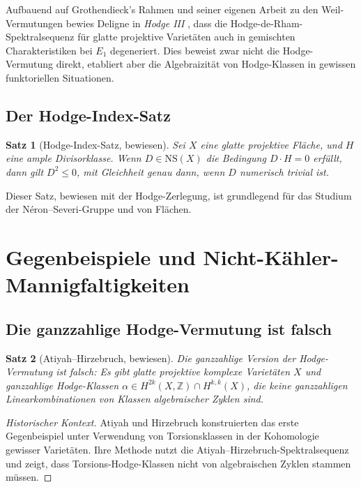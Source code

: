 \documentclass[12pt,a4paper]{amsart}
\newtheorem{theorem}{Satz}[section]
\theoremstyle{definition}
\theoremstyle{remark}
\begin{document}
Aufbauend auf Grothendieck's Rahmen und seiner eigenen Arbeit zu den Weil-Vermutungen
bewies Deligne in \emph{Hodge III} \cite{deligne1974}, dass die Hodge-de-Rham-Spektralsequenz
für glatte projektive Varietäten auch in gemischten Charakteristiken bei $E_1$ degeneriert.
Dies beweist zwar nicht die Hodge-Vermutung direkt, etabliert aber die Algebraizität von
Hodge-Klassen in gewissen funktoriellen Situationen.

\subsection{Der Hodge-Index-Satz}

\begin{theorem}[Hodge-Index-Satz, bewiesen]
\label{thm:hodge-index}
Sei $X$ eine glatte projektive Fläche, und $H$ eine ample Divisorklasse. Wenn
$D \in \mathrm{NS}(X)$ die Bedingung $D \cdot H = 0$ erfüllt, dann gilt $D^2 \le 0$,
mit Gleichheit genau dann, wenn $D$ numerisch trivial ist.
\end{theorem}

Dieser Satz, bewiesen mit der Hodge-Zerlegung, ist grundlegend für das Studium der
Néron–Severi-Gruppe und von Flächen.

\section{Gegenbeispiele und Nicht-Kähler-Mannigfaltigkeiten}
\label{sec:gegenbeispiele}

\subsection{Die ganzzahlige Hodge-Vermutung ist falsch}

\begin{theorem}[Atiyah–Hirzebruch, bewiesen]
\label{thm:ah-gegenbeispiel}
Die ganzzahlige Version der Hodge-Vermutung ist falsch: Es gibt glatte projektive
komplexe Varietäten $X$ und ganzzahlige Hodge-Klassen
$\alpha \in H^{2k}(X, \mathbb{Z}) \cap H^{k,k}(X)$, die keine ganzzahligen
Linearkombinationen von Klassen algebraischer Zyklen sind.
\end{theorem}

\begin{proof}[Historischer Kontext]
Atiyah und Hirzebruch \cite{atiyah_hirzebruch1961} konstruierten das erste Gegenbeispiel
unter Verwendung von Torsionsklassen in der Kohomologie gewisser Varietäten. Ihre Methode
nutzt die Atiyah–Hirzebruch-Spektralsequenz und zeigt, dass Torsions-Hodge-Klassen nicht
von algebraischen Zyklen stammen müssen.
\end{proof}
\end{document}
